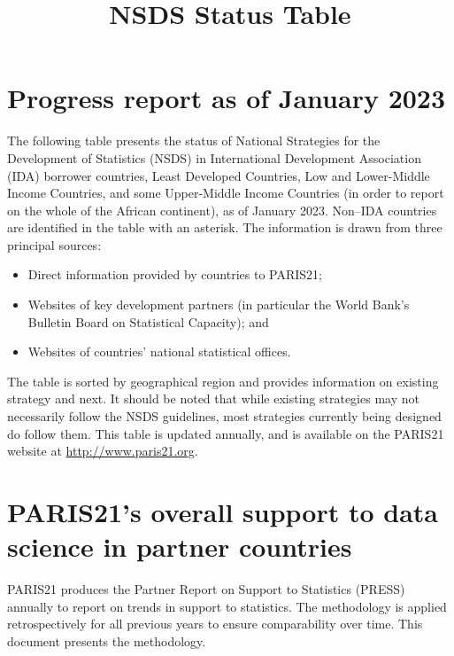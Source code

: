 \documentclass[
]{article}
\title{NSDS Status Table}
\author{}
\date{\vspace{-2.5em}}
\providecommand{\tightlist}{%
  \setlength{\itemsep}{0pt}\setlength{\parskip}{0pt}}
\begin{document}
\maketitle

{
\setcounter{tocdepth}{2}
\tableofcontents
}
\hypertarget{progress-report-as-of-january-2023}{%
\section*{Progress report as of January 2023}\label{progress-report-as-of-january-2023}}

The following table presents the status of National Strategies for the Development of Statistics (NSDS) in International Development Association (IDA) borrower countries, Least Developed Countries, Low and Lower-Middle Income Countries, and some Upper-Middle Income Countries (in order to report on the whole of the African continent), as of January 2023. Non--IDA countries are identified in the table with an asterisk. The information is drawn from three principal sources:

\begin{itemize}
\tightlist
\item
  Direct information provided by countries to PARIS21;
\item
  Websites of key development partners (in particular the World Bank's Bulletin Board on Statistical Capacity); and
\item
  Websites of countries' national statistical offices.
\end{itemize}

The table is sorted by geographical region and provides information on existing strategy and next. It should be noted that while existing strategies may not necessarily follow the NSDS guidelines, most strategies currently being designed do follow them. This table is updated annually, and is available on the PARIS21 website at \url{http://www.paris21.org}.

\hypertarget{paris21s-overall-support-to-data-science-in-partner-countries}{%
\section{PARIS21's overall support to data science in partner countries}\label{paris21s-overall-support-to-data-science-in-partner-countries}}

PARIS21 produces the Partner Report on Support to Statistics (PRESS) annually to report on trends in
support to statistics. The methodology is applied retrospectively for all previous years to ensure
comparability over time. This document presents the methodology.
\end{document}
